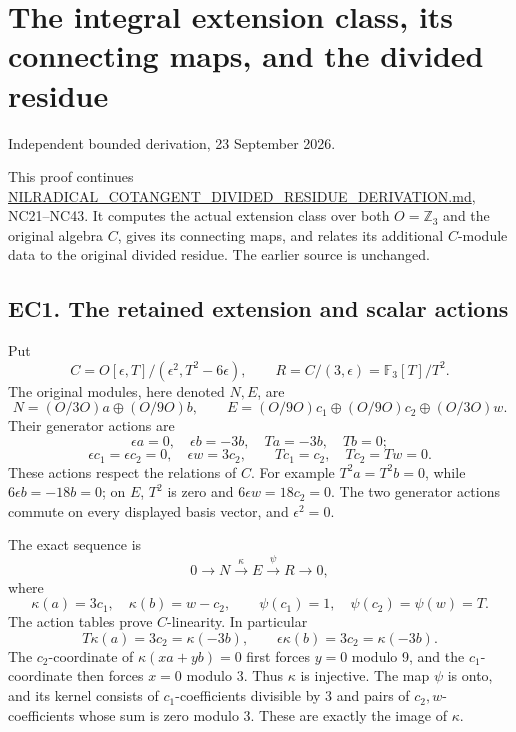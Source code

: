 \documentclass[
  10pt,
  a4paper,
]{article}
\author{}
\date{}
\begin{document}
{
\setcounter{tocdepth}{3}
\tableofcontents
}
\section{The integral extension class, its connecting maps, and the
divided
residue}\label{the-integral-extension-class-its-connecting-maps-and-the-divided-residue}

Independent bounded derivation, 23 September 2026.

This proof continues
\href{https://github.com/KokunoYumeto/zeta-function-research-reader/blob/5a89872598df0902b7c1393cf8e4692ca3010a95/workbenches/splitzero-tandem/branches/tau-zero-prime-positivity/research_calculations/NILRADICAL_COTANGENT_DIVIDED_RESIDUE_DERIVATION.md}{NILRADICAL\_COTANGENT\_DIVIDED\_RESIDUE\_DERIVATION.md},
NC21--NC43. It computes the actual extension class over both
\(O=\mathbb Z_3\) and the original algebra \(C\), gives its connecting
maps, and relates its additional \(C\)-module data to the original
divided residue. The earlier source is unchanged.

\subsection{EC1. The retained extension and scalar
actions}\label{ec1.-the-retained-extension-and-scalar-actions}

Put \[
C=O[\epsilon,T]/(\epsilon^2,T^2-6\epsilon),\qquad
R=C/(3,\epsilon)=\mathbb F_3[T]/T^2.
\tag{EC1}
\] The original modules, here denoted \(N,E\), are \[
N=(O/3O)a\oplus(O/9O)b,\qquad
E=(O/9O)c_1\oplus(O/9O)c_2\oplus(O/3O)w.
\tag{EC2}
\] Their generator actions are \[
\epsilon a=0,\quad\epsilon b=-3b,\quad
Ta=-3b,\quad Tb=0;
\tag{EC3}
\] \[
\epsilon c_1=\epsilon c_2=0,\quad\epsilon w=3c_2,\qquad
Tc_1=c_2,\quad Tc_2=Tw=0.
\tag{EC4}
\] These actions respect the relations of \(C\). For example
\(T^2a=T^2b=0\), while \(6\epsilon b=-18b=0\); on \(E\), \(T^2\) is zero
and \(6\epsilon w=18c_2=0\). The two generator actions commute on every
displayed basis vector, and \(\epsilon^2=0\).

The exact sequence is \[
0\longrightarrow N\xrightarrow{\kappa}E\xrightarrow{\psi}R
\longrightarrow0,
\tag{EC5}
\] where \[
\kappa(a)=3c_1,\quad\kappa(b)=w-c_2,\qquad
\psi(c_1)=1,\quad\psi(c_2)=\psi(w)=T.
\tag{EC6}
\] The action tables prove \(C\)-linearity. In particular \[
T\kappa(a)=3c_2=\kappa(-3b),\qquad
\epsilon\kappa(b)=3c_2=\kappa(-3b).
\] The \(c_2\)-coordinate of \(\kappa(xa+yb)=0\) first forces \(y=0\)
modulo 9, and the \(c_1\)-coordinate then forces \(x=0\) modulo 3. Thus
\(\kappa\) is injective. The map \(\psi\) is onto, and its kernel
consists of \(c_1\)-coefficients divisible by 3 and pairs of
\(c_2,w\)-coefficients whose sum is zero modulo 3. These are exactly the
image of \(\kappa\).
\end{document}
